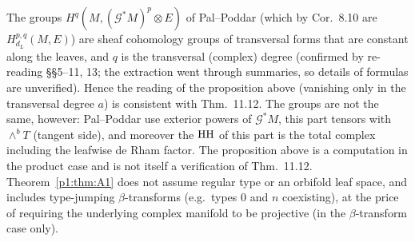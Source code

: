 \begin{rem}[\tQ]
The groups $H^q(M,(\mathcal G^*M)^p\otimes E)$ of Pal--Poddar (which by Cor.~8.10 are $H^{p,q}_{d_L}(M,E)$) are sheaf cohomology groups of transversal forms that are constant along the leaves, and $q$ is the transversal (complex) degree (confirmed by re-reading \S\S5--11, 13; the extraction went through summaries, so details of formulas are unverified). Hence the reading of the proposition above (vanishing only in the transversal degree $a$) is consistent with Thm.~11.12. The groups are not the same, however: Pal--Poddar use exterior powers of $\mathcal G^*M$, this part tensors with $\wedge^bT$ (tangent side), and moreover the $\mathrm{HH}$ of this part is the total complex including the leafwise de Rham factor. The proposition above is a computation in the product case and is not itself a verification of Thm.~11.12. Theorem~\ref{p1:thm:A1} does not assume regular type or an orbifold leaf space, and includes type-jumping $\beta$-transforms (e.g.\ types $0$ and $n$ coexisting), at the price of requiring the underlying complex manifold to be projective (in the $\beta$-transform case only).
\end{rem}

